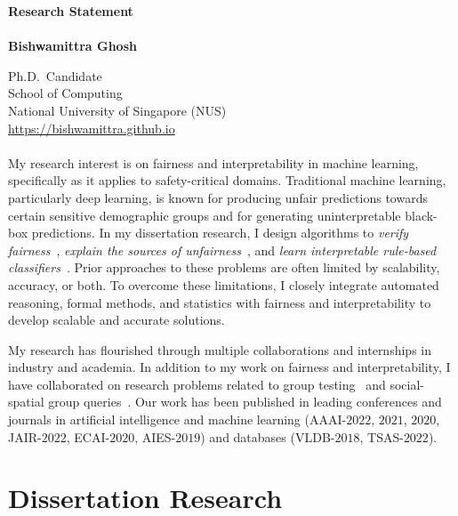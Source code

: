 \documentclass[11pt]{article}
\newcommand{\blue}[1]{\textcolor{blue}{#1}}
\begin{document}
	\noindent\huge \textbf{Research Statement} \\
	\vspace{0.1em}\\
	\Large \textbf{Bishwamittra Ghosh}
		
	\normalsize
	\noindent Ph.D.\ Candidate\\
	School of Computing\\
	National University of Singapore (NUS)\\
	\blue{\url{https://bishwamittra.github.io}}



	\paragraph{}
	My research interest is on fairness and interpretability in machine learning, specifically as it applies to safety-critical domains. Traditional machine learning, particularly deep learning, is known for producing unfair predictions towards certain sensitive demographic groups and for generating uninterpretable black-box predictions. In my dissertation research, I design algorithms to \textit{verify fairness}~\cite{ghosh2021justicia, ghosh2022algorithmic}, \textit{explain the sources of unfairness}~\cite{ghosh2022how}, and \textit{learn interpretable rule-based classifiers}~\cite{ghosh22efficient, ghosh2019incremental, ghosh2020classification}. Prior approaches to these problems are often limited by scalability, accuracy, or both. To overcome these limitations, I closely integrate automated reasoning, formal methods, and statistics with fairness and interpretability to develop scalable and accurate solutions.
	
	

	
	
	My research has flourished through multiple collaborations and internships in industry and academia. In addition to my work on fairness and interpretability, I have collaborated on research problems related to group testing~\cite{ciampiconi2020maxsat} and social-spatial group queries~\cite{ghosh2018flexible, apon2021social}. Our work has been published in leading conferences and journals in artificial intelligence and machine learning (AAAI-$2022$, $2021$, $2020$, JAIR-$2022$, ECAI-$2020$, AIES-$2019$) and databases (VLDB-$2018$, TSAS-$2022$).
	
	
	
	
	
	\section*{Dissertation Research}
	
\end{document}
